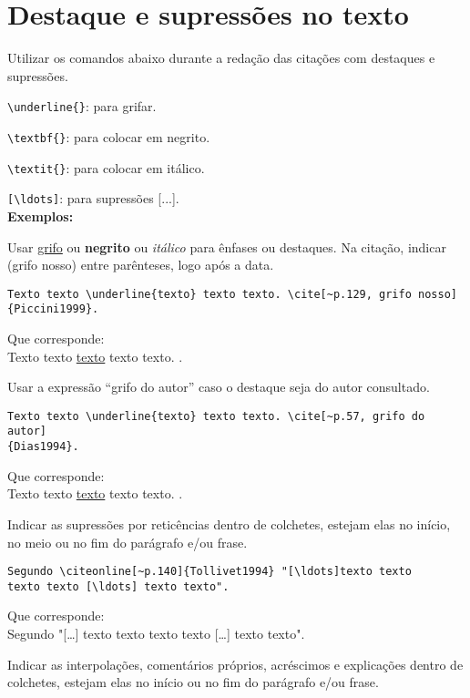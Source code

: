 \section{Destaque e supressões no texto}

Utilizar os comandos abaixo durante a redação das citações com destaques e supressões.

\verb+\underline{}+: para grifar.

\verb+\textbf{}+: para colocar em negrito.

\verb+\textit{}+: para colocar em itálico.

\verb+[\ldots]+: para supressões [...]. \\

\textbf{Exemplos:}

\begin{alineas}
\item
Usar \underline{grifo} ou \textbf{negrito} ou \textit{itálico} para ênfases ou destaques. Na citação, indicar (grifo nosso) entre parênteses, logo após a data.
\begin{verbatim}
Texto texto \underline{texto} texto texto. \cite[~p.129, grifo nosso]
{Piccini1999}.
\end{verbatim}	
Que corresponde: \\
Texto texto \underline{texto} texto texto. \cite[~p.129, grifo nosso]{Piccini1999}.\\
\item
Usar a expressão “grifo do autor” caso o destaque seja do autor consultado.
\begin{verbatim}
Texto texto \underline{texto} texto texto. \cite[~p.57, grifo do autor]
{Dias1994}.
\end{verbatim}
Que corresponde: \\
Texto texto \underline{texto} texto texto. \cite[~p.57, grifo do autor]{Dias1994}.\\
\item
Indicar as supressões por reticências dentro de colchetes, estejam elas no início, no meio ou no fim do parágrafo e/ou frase.
\begin{verbatim}
Segundo \citeonline[~p.140]{Tollivet1994} "[\ldots]texto texto 
texto texto [\ldots] texto texto". 
\end{verbatim}
Que corresponde:\\
Segundo  "[\ldots] texto texto texto texto [\ldots] texto texto".\\ 
\item
Indicar as interpolações, comentários próprios, acréscimos e explicações dentro de colchetes, estejam elas no início ou no fim do parágrafo e/ou frase.

\end{alineas}
